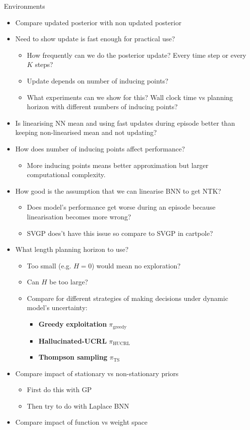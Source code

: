 \documentclass{article}
\newcommand{\Horizon}{\ensuremath{H}}
\begin{document}
Environments
\begin{itemize}
  \item Compare updated posterior with non updated posterior
  \item Need to show update is fast enough for practical use?
  \begin{itemize}
    \item How frequently can we do the posterior update? Every time step or every $K$ steps?
    \item Update depends on number of inducing points?
    \item What experiments can we show for this? Wall clock time vs planning horizon with different numbers of inducing points?
  \end{itemize}
  \item Is linearising NN mean and using fast updates during episode better than keeping non-linearised mean and not updating?
  \item How does number of inducing points affect performance?
  \begin{itemize}
    \item More inducing points means better approximation but larger computational complexity.
  \end{itemize}
  \item How good is the assumption that we can linearise BNN to get NTK?
  \begin{itemize}
    \item Does model's performance get worse during an episode because linearisation becomes more wrong?
    \item SVGP does't have this issue so compare to SVGP in cartpole?
  \end{itemize}
  \item What length planning horizon to use?
  \begin{itemize}
    \item Too small (e.g. $\Horizon=0$) would mean no exploration?
    \item Can $\Horizon$ be too large?
  \end{itemize}
  \begin{itemize}
  \item Compare for different strategies of making decisions under dynamic model's uncertainty:
    \begin{itemize}
      \item \textbf{Greedy exploitation} \(\pi_{\text{greedy}}\)
      \item \textbf{Hallucinated-UCRL} \(\pi_{\text{HUCRL}}\)
      \item \textbf{Thompson sampling} \(\pi_{\text{TS}}\)
    \end{itemize}
  \end{itemize}
  \item Compare impact of stationary vs non-stationary priors
  \begin{itemize}
    \item First do this with GP
    \item Then try to do with Laplace BNN
  \end{itemize}
  \item Compare impact of function vs weight space
\end{itemize}
\end{document}
